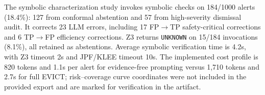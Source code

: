 The symbolic characterization study invokes symbolic checks on 184/1000 alerts (18.4\%): 127 from conformal abstention and 57 from high-severity dismissal audit. It corrects 23 LLM errors, including 17 FP$\rightarrow$TP safety-critical corrections and 6 TP$\rightarrow$FP efficiency corrections. Z3 returns \texttt{UNKNOWN} on 15/184 invocations (8.1\%), all retained as abstentions. Average symbolic verification time is 4.2s, with Z3 timeout 2s and JPF/KLEE timeout 10s. The implemented cost profile is 820 tokens and 1.1s per alert for evidence-free prompting versus 1,710 tokens and 2.7s for full EVICT; risk--coverage curve coordinates were not included in the provided export and are marked for verification in the artifact.

